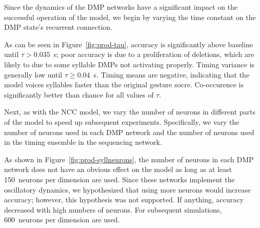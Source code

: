Since the dynamics of the DMP networks
have a significant impact
on the successful operation of the model,
we begin by varying
the time constant on
the DMP state's recurrent connection.


As can be seen in Figure~\ref{fig:prod-tau},
accuracy is significantly above baseline
until $\tau > 0.035$~s;
poor accuracy is due to a proliferation
of deletions,
which are likely to due to some syllable DMPs
not activating properly.
Timing variance is generally low
until $\tau \ge 0.04$~s.
Timing means are negative,
indicating that the model
voices syllables faster
than the original gesture socre.
Co-occurence is significantly
better than chance for all values of $\tau$.

Next, as with the NCC model,
we vary the number of neurons
in different parts of the model
to speed up subsequent experiments.
Specifically, we vary the number of neurons
used in each DMP network and
the number of neurons used in the
timing ensemble in the sequencing network.


As shown in Figure~\ref{fig:prod-syllneurons},
the number of neurons in each DMP network
does not have an obvious effect
on the model as long as at least
150~neurons per dimension are used.
Since these networks implement
the oscillatory dynamics, we hypothesized
that using more neurons would
increase accuracy;
however, this hypothesis was not supported.
If anything, accuracy decreased with
high numbers of neurons.
For subsequent simulations,
600~neurons per dimension are used.

